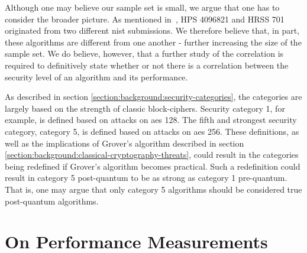 Although one may believe our sample set is small, we argue that one has to consider the broader picture. As mentioned in~\cite{ntru2020}, HPS 4096821 and HRSS 701 originated from two different \gls{nist} submissions. We therefore believe that, in part, these algorithms are different from one another - further increasing the size of the sample set. We do believe, however, that a further study of the correlation is required to definitively state whether or not there is a correlation between the security level of an algorithm and its performance.

As described in section \ref{section:background:security-categories}, the categories are largely based on the strength of classic block-ciphers. Security category 1, for example, is defined based on attacks on \gls{aes} 128. The fifth and strongest security category, category 5, is defined based on attacks on \gls{aes} 256. These definitions, as well as the implications of Grover's algorithm described in section \ref{section:background:classical-cryptography-threats}, could result in the categories being redefined if Grover's algorithm becomes practical. Such a redefinition could result in category 5 \gls{post-quantum} to be as strong as category 1 pre-quantum. That is, one may argue that only category 5 algorithms should be considered true \gls{post-quantum} algorithms.

\section{On Performance Measurements}
\label{section:discussion:performance-measurements}

